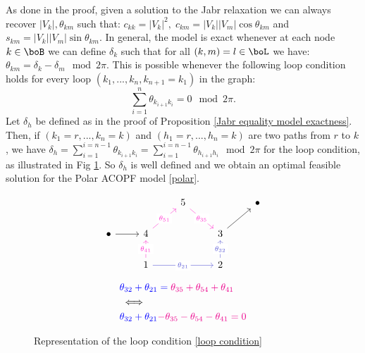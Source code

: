 \documentclass[11pt,a4paper,oneside,openany]{book}
\numberwithin{definition}{section}
\numberwithin{theorem}{section}
\numberwithin{problem}{section}
\begin{document}
As done in the proof, given a solution to the Jabr relaxation we can always recover $|V_k|,\theta_{km}$ such that: $c_{kk} = |V_k|^2, \; c_{km} = |V_k||V_m|\cos{\theta_{km}} $ and $s_{km} = |V_k||V_m|\sin{\theta_{km}}$.
In general, the model is exact whenever at each node $k \in \boB$ we can define $\delta_k$ such that for all $(k,m) =l \in \boL$ we have: $\theta_{km} = \delta_k - \delta_m \mod 2\pi$. This is possible whenever the following loop condition holds for every loop $(k_1,...,k_n,k_{n+1}=k_1)$ in the graph: 
\begin{equation} \label{loop condition}
    \sum_{i=1}^{n}\theta_{k_{i+1}k_i}=0  \mod 2\pi.
\end{equation}
 Let  $\delta_h$ be defined as in the proof of Proposition \ref{Jabr equality model exactness}. Then, if $(k_1=r,...,k_n=k)$ and $(h_1=r,...,h_n=k)$ are two paths from $r$ to $k$, we have $\delta_h =  \sum_{i=1}^{i=n-1}\theta_{k_{i+1}k_{i}} =  \sum_{i=1}^{i=n-1}\theta_{h_{i+1}h_{i}} \mod 2\pi $ for the loop condition, as illustrated in Fig \ref{fig:loop constraint}. So $\delta_h$ is well defined and we obtain an optimal feasible solution for the Polar ACOPF model \ref{polar}.


\noindent
\begin{figure}[htb]
\begin{minipage}{0.5\textwidth}
\centering
\[
\begin{tikzcd}[ampersand replacement=\&]
\&\& 5 \&\& \bullet \\
\bullet \& 4 \&\& 3 \& \\
\& 1 \&\& 2 \&
\arrow["{\theta_{41}}"{description}, color={rgb,255:red,255;green,51;blue,207}, from=3-2, to=2-2]
\arrow["{\theta_{51}}"{description}, color={rgb,255:red,255;green,51;blue,207}, from=2-2, to=1-3]
\arrow["{\theta_{35}}"{description}, color={rgb,255:red,255;green,51;blue,207}, from=1-3, to=2-4]
\arrow["{\theta_{21}}"{description}, color={rgb,255:red,92;green,92;blue,214}, from=3-2, to=3-4]
\arrow["{\theta_{32}}"{description}, color={rgb,255:red,92;green,92;blue,214}, from=3-4, to=2-4]
\arrow[from=2-4, to=1-5]
\arrow[from=2-1, to=2-2]
\end{tikzcd}
\]


\end{minipage}%
\begin{minipage}{0.5\textwidth}
\centering
\begin{align*}
    &{\color{blue}{\theta_{32}  + \theta_{21}} =  \color{magenta}{\theta_{35} + \theta_{54} + \theta_{41}}} \\
    &\iff \\
    &{\color{blue}{\theta_{32}  + \theta_{21}}  \color{magenta}{- \theta_{35} - \theta_{54} - \theta_{41}}= 0}\\
\end{align*}
\end{minipage}
    \caption{Representation of the loop condition \eqref{loop condition}}
    \label{fig:loop constraint}
\end{figure}
\end{document}
